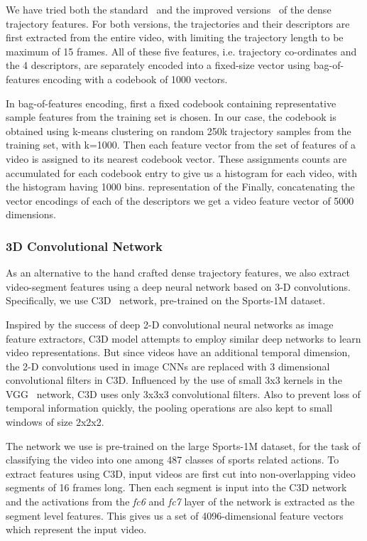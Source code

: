 We have tried both the standard~\cite{DBLP:conf/cvpr/WangKSL11} and the improved
versions~\cite{Wang2013} of the dense trajectory features.
For both versions, the trajectories and their descriptors are first extracted
from the entire video, with limiting the trajectory length to be maximum of 15
frames.
All of these five features, i.e. trajectory co-ordinates and the 4 descriptors,
are separately encoded into a fixed-size vector using bag-of-features encoding
with a codebook of 1000 vectors.

In bag-of-features encoding, first a fixed codebook containing representative
sample features from the training set is chosen.
In our case, the codebook is obtained using k-means clustering on random 250k
trajectory samples from the training set, with k=1000.
Then each feature vector from the set of features of a video is assigned to its
nearest codebook vector.
These assignments counts are accumulated for each codebook entry to give us a
histogram for each video, with the histogram having 1000 bins. representation of the 
Finally, concatenating the vector encodings of each of the descriptors we get a
video feature vector of 5000 dimensions. 

\subsubsection{3D Convolutional Network}
As an alternative to the hand crafted dense trajectory features, we also extract
video-segment features using a deep neural network based on 3-D
convolutions. 
Specifically, we use C3D~\cite{DBLP:C3D} network, pre-trained on the Sports-1M
dataset.

Inspired by the success of deep 2-D convolutional neural networks as image
feature extractors, C3D model attempts to employ similar deep networks to learn
video representations.
But since videos have an additional temporal dimension, the 2-D convolutions
used in image CNNs are replaced with 3 dimensional convolutional filters in C3D.
Influenced by the use of small 3x3 kernels in the VGG~\cite{Simonyan14c}
network, C3D uses only 3x3x3 convolutional filters.
Also to prevent loss of temporal information quickly, the pooling operations are
also kept to small windows of size 2x2x2.

The network we use is pre-trained on the large Sports-1M dataset, for the task
of classifying the video into one among 487 classes of sports related actions.
To extract features using C3D, input videos are first cut into non-overlapping
video segments of 16 frames long.
Then each segment is input into the C3D network and the activations from the
\emph{fc6} and \emph{fc7} layer of the network is extracted as the segment level
features.
This gives us a set of 4096-dimensional feature vectors which represent the
input video.

